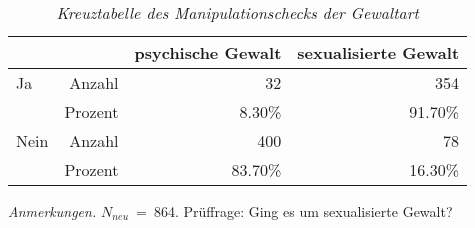 \begin{table}[htb]
    \caption[Kreuztabelle Manipulationscheck Gewaltart]{\textit {Kreuztabelle des Manipulationschecks der Gewaltart}} 
    \label{KT_G}
    \centering
    \begin{adjustbox}{width=10cm} %
    \small
    \begin{tabular}{lrrr}
      \hline
        &   & psychische Gewalt & sexualisierte Gewalt \\
      \hline
    Ja   & Anzahl  & 32      & 354     \\
         & Prozent & 8.30\%  & 91.70\% \\
    Nein & Anzahl  & 400     & 78      \\
         & Prozent & 83.70\% & 16.30\% \\
       \hline
    \end{tabular}
    \end{adjustbox}
    
    \begin{tablenotes}
        \item \textit{Anmerkungen.} \( N_{neu} \)~=~864. Prüffrage: Ging es um sexualisierte Gewalt?
      \end{tablenotes}
    \end{table}